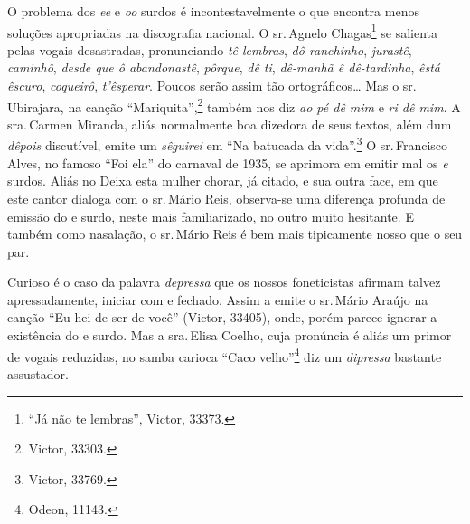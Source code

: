O problema dos \textit{ee} e \textit{oo} surdos é incontestavelmente o que encontra menos
soluções apropriadas na discografia nacional. O sr.\,Agnelo Chagas\footnote{``Já
não te lembras'', Victor, 33373.} se salienta pelas vogais desastradas,
pronunciando \textit{tê lembras}, \textit{dô ranchinho}, \textit{jurastê}, \textit{caminhô},
\textit{desde que ô abandonastê}, \textit{pôrque}, \textit{dê ti}, \textit{dê-manhã ê
dê-tardinha}, \textit{êstá êscuro}, \textit{coqueirô}, \textit{t'êsperar}. Poucos
serão assim tão ortográficos\ldots{} Mas o sr.\,Ubirajara, na canção
``Mariquita'',\footnote{Victor, 33303.} também nos diz \textit{ao pé dê mim} e \textit{ri dê
mim}. A sra.\,Carmen Miranda, aliás normalmente boa dizedora de seus
textos, além dum \textit{dêpois} discutível, emite um \textit{sêguirei} em ``Na
batucada da vida''.\footnote{Victor, 33769.} O sr.\,Francisco Alves, no famoso
``Foi ela'' do carnaval de 1935, se aprimora em emitir mal os \textit{e} surdos.
Aliás no Deixa esta mulher chorar, já citado, e sua outra face, em que
este cantor dialoga com o sr.\,Mário Reis, observa-se uma diferença
profunda de emissão do e surdo, neste mais familiarizado, no outro muito
hesitante. E também como nasalação, o sr.\,Mário Reis é bem mais
tipicamente nosso que o seu par.

Curioso é o caso da palavra \textit{depressa} que os nossos foneticistas
afirmam talvez apressadamente, iniciar com e fechado. Assim a emite o
sr.\,Mário Araújo na canção ``Eu hei-de ser de você'' (Victor, 33405),
onde, porém parece ignorar a existência do e surdo. Mas a sra.\,Elisa
Coelho, cuja pronúncia é aliás um primor de vogais reduzidas, no samba
carioca ``Caco velho''\footnote{Odeon, 11143.} diz um \textit{dipressa} bastante
assustador.

